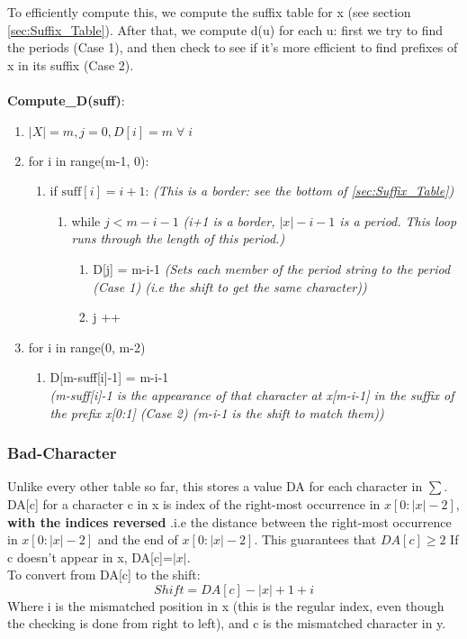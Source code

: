 \noindent To efficiently compute this, we compute the suffix table for x (see section \ref{sec:Suffix_Table}). 
After that, we compute d(u) for each u: first we try to find the periods (Case 1), and then check to see if it's more efficient to find prefixes of x in its suffix (Case 2).\\ \\
\textbf{Compute\_D(suff)}:
\begin{enumerate}[label=\Alph*]
    \item \(|X| = m, j=0, D[i] = m\; \forall\; i \)
    \item for i in range(m-1, 0):
\begin{enumerate}[label=\arabic*]
    \item if $ \text{suff}[i] = i+1 $:  \emph{(This is a border: see the bottom of \ref{sec:Suffix_Table})}
    \begin{enumerate}
        \item [] while \( j < m-i-1\) \emph{(i+1 is a border, $|x|-i-1$ is a period. This loop runs through the length of this period.)}
        \begin{enumerate}
            \item D[j] = m-i-1 \emph{(Sets each member of the period string to the period (Case 1) (i.e the shift to get the same character))}
            \item j ++
        \end{enumerate}    
    \end{enumerate}    
\end{enumerate}    
    \item for i in range(0, m-2)
    \begin{enumerate}
        \item [] D[m-suff[i]-1] = m-i-1 \\ \emph{(m-suff[i]-1 is the appearance of that character at x[m-i-1] in the suffix of the prefix x[0:1] (Case 2) (m-i-1 is the shift to match them))}
    \end{enumerate}  
\end{enumerate}

\newpage
\subsubsection{Bad-Character}
Unlike every other table so far, this stores a value DA for each character in $\sum$. DA[c] for a character c in x is index of the right-most occurrence in $x[0:|x|-2]$, \textbf{with the indices reversed }.i.e the distance between the right-most occurrence in $x[0:|x|-2]$ and the end of $x[0:|x|-2]$. This guarantees that $DA[c] \geq 2$ If c doesn't appear in x, DA[c]=$|x|$.\\
To convert from DA[c] to the shift:
\begin{equation}
    Shift = DA[c]-|x|+1+i 
\end{equation}
Where i is the mismatched position in x (this is the regular index, even though the checking is done from right to left), and c is the mismatched character in y. 

